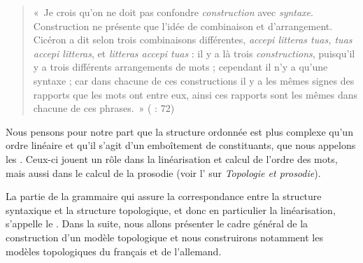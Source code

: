 \begin{quote}
    «~Je crois qu’on ne doit pas confondre \textit{construction} avec \textit{syntaxe}. Construction ne présente que l’idée de combinaison et d’arrangement. Cicéron a dit selon trois combinaisons différentes, \textit{accepi litteras tuas, tuas accepi litteras}, et \textit{litteras accepi tuas} : il y a là trois \textit{constructions}, puisqu’il y a trois différents arrangements de mots ; cependant il n’y a qu’une syntaxe ; car dans chacune de ces constructions il y a les mêmes signes des rapports que les mots ont entre eux, ainsi ces rapports sont les mêmes dans chacune de ces phrases.~» (\cite{Dumarsais1754} : 72)
\end{quote}

Nous pensons pour notre part que la structure ordonnée est plus complexe qu’un ordre linéaire et qu’il s’agit d’un emboîtement de constituants, que nous appelons les . Ceux-ci jouent un rôle dans la linéarisation et calcul de l'ordre des mots, mais aussi dans le calcul de la prosodie (voir l’ sur \textit{Topologie et prosodie}).

La partie de la grammaire qui assure la correspondance entre la structure syntaxique et la structure topologique, et donc en particulier la linéarisation, s’appelle le . Dans la suite, nous allons présenter le cadre général de la construction d’un modèle topologique et nous construirons notamment les modèles topologiques du français et de l’allemand.

